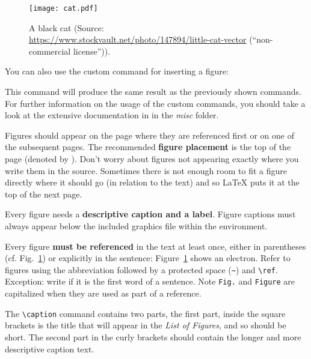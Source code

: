 \begin{figure}[t] %
\centering
\texttt{[image: cat.pdf]}
\decoRule
\caption[A black cat]{A black cat (Source: \url{https://www.stockvault.net/photo/147894/little-cat-vector} (``non-commercial license'')).}
\label{fig:cat}
\end{figure}

You can also use the custom command  for inserting a figure:

\begin{latex}
\end{latex}

This command will produce the same result as the previously shown commands.
For further information on the usage of the custom commands, you should take a look at the extensive documentation in  in the \emph{misc} folder.

Figures should appear on the page where they are referenced first or on one of the subsequent pages. The recommended \textbf{figure placement} is the top of the page (denoted by \code{[t]}). Don't worry about figures not appearing exactly where you write them in the source. Sometimes there is not enough room to fit a figure directly where it should go (in relation to the text) and so LaTeX puts it at the top of the next page.

Every figure needs a \textbf{descriptive caption and a label}. Figure captions must always appear below the included graphics file within the  environment.

Every figure \textbf{must be referenced} in the text at least once, either in parentheses (cf. Fig.~\ref{fig:cat}) or explicitly in the sentence: Figure~\ref{fig:cat} shows an electron. Refer to figures using the abbreviation  followed by a protected space (\verb|~|) and \verb|\ref|. Exception: write  if it is the first word of a sentence. Note \verb|Fig.| and \verb|Figure| are capitalized when they are used as part of a reference.

The \verb|\caption| command contains two parts,
the first part, inside the square brackets%
is the title that will appear in the \emph{List of Figures}, and so should be short.
 The second part in the curly brackets should contain the longer and more descriptive caption text.

